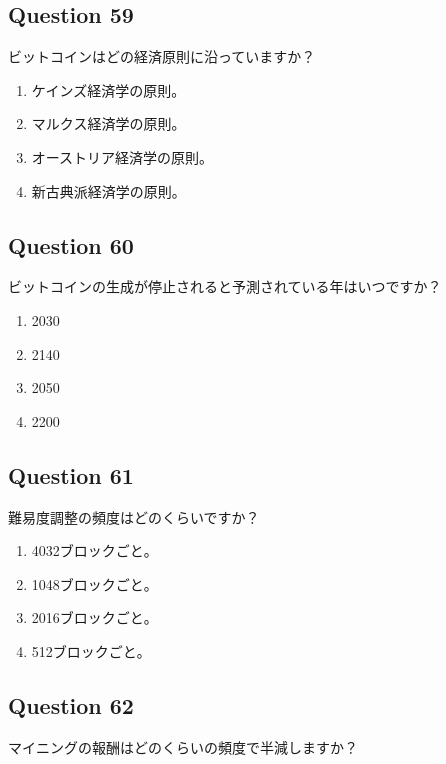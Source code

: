 \documentclass[12pt,a4paper]{article}
\begin{document}
\bigskip


\subsection*{Question 59}
ビットコインはどの経済原則に沿っていますか？

\begin{enumerate}[label=\Alph*., leftmargin=*]
\item ケインズ経済学の原則。
\item マルクス経済学の原則。
\item オーストリア経済学の原則。
\item 新古典派経済学の原則。
\end{enumerate}

\bigskip


\subsection*{Question 60}
ビットコインの生成が停止されると予測されている年はいつですか？

\begin{enumerate}[label=\Alph*., leftmargin=*]
\item 2030
\item 2140
\item 2050
\item 2200
\end{enumerate}

\bigskip


\subsection*{Question 61}
難易度調整の頻度はどのくらいですか？

\begin{enumerate}[label=\Alph*., leftmargin=*]
\item 4032ブロックごと。
\item 1048ブロックごと。
\item 2016ブロックごと。
\item 512ブロックごと。
\end{enumerate}

\bigskip


\subsection*{Question 62}
マイニングの報酬はどのくらいの頻度で半減しますか？
\end{document}
